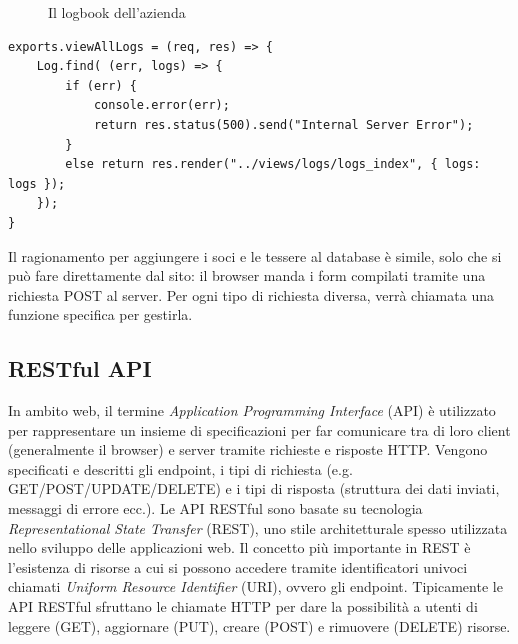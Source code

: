 \documentclass[12pt]{report}
\begin{document}
\begin{enumerate}[(I)]
\begin{figure}[H]
	\caption{Il logbook dell'azienda}
	\label{fig:logbook}
\end{figure}
\begin{lstlisting}[caption={Questa funzione viene eseguita quando un browser accede (richiesta GET) all'endpoint \emph{/api/logs/view}}, label={lst:viewLogs}, xleftmargin=\dimexpr-\leftmargini]
exports.viewAllLogs = (req, res) => {
	Log.find( (err, logs) => {
		if (err) {
			console.error(err);
			return res.status(500).send("Internal Server Error");
		}
		else return res.render("../views/logs/logs_index", { logs: logs });
	});
}
\end{lstlisting}

\end{enumerate}

Il ragionamento per aggiungere i soci e le tessere al database è simile, solo che si può fare direttamente dal sito: il browser manda i form compilati tramite una richiesta POST al server. Per ogni tipo di richiesta diversa, verrà chiamata una funzione specifica per gestirla.


\subsection{RESTful API}\label{sec:api}
%
In ambito web, il termine \emph{Application Programming Interface} (API) è utilizzato per rappresentare un insieme di specificazioni per far comunicare tra di loro client (generalmente il browser) e server tramite richieste e risposte HTTP. Vengono specificati e descritti gli endpoint, i tipi di richiesta (e.g. GET/POST/UPDATE/DELETE) e i tipi di risposta (struttura dei dati inviati, messaggi di errore ecc.).
Le API RESTful sono basate su tecnologia \emph{Representational State Transfer} (REST), uno stile architetturale spesso utilizzata nello sviluppo delle applicazioni web. Il concetto più importante in REST è l'esistenza di risorse a cui si possono accedere tramite identificatori univoci chiamati \emph{Uniform Resource Identifier} (URI), ovvero gli endpoint.
Tipicamente le API RESTful sfruttano le chiamate HTTP per dare la possibilità a utenti di leggere (GET), aggiornare (PUT), creare (POST) e rimuovere (DELETE) risorse. 
\end{document}
